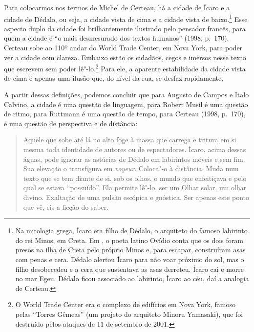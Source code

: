 Para colocarmos nos termos de Michel de Certeau, há a cidade de Ícaro e
a cidade de Dédalo, ou seja, a cidade vista de cima e a cidade vista de
baixo.\footnote{Na mitologia grega, Ícaro era filho de Dédalo, o
  arquiteto do famoso labirinto do rei Minos, em Creta. Em
  {}, o poeta latino Ovídio conta que os dois foram
  presos na ilha de Creta pelo próprio Minos e, para escapar,
  construíram asas com penas e cera. Dédalo alertou Ícaro para não voar
  próximo do sol, mas o filho desobecedeu e a cera que sustentava as
  asas derreteu. Ícaro cai e morre no mar Egeu. Dédalo ficou associado
  ao labirinto, Ícaro ao céu, daí a analogia de Certeau.} Esse aspecto
duplo da cidade foi brilhantemente ilustrado pelo pensador francês, para
quem a cidade é ``o mais desmesurado dos textos humanos'' (1998, p.~170). Certeau sobe ao 110º andar do World Trade Center, em Nova York,
para poder ver a cidade com clareza. Embaixo estão os cidadãos, cegos e
imersos nesse texto que escrevem sem poder lê"-lo.\footnote{O World Trade
  Center era o complexo de edifícios em Nova York, famoso pelas ``Torres
  Gêmeas'' (um projeto do arquiteto Minoru Yamasaki), que foi destruído
  pelos ataques de 11 de setembro de 2001.} Para ele, a aparente
estabilidade da cidade vista de cima é apenas uma ilusão que, do nível
da rua, se desfaz rapidamente.

A partir dessas definições, podemos concluir que para Augusto de Campos
e Italo Calvino, a cidade é uma questão de linguagem, para Robert Musil
é uma questão de ritmo, para Ruttmann é uma questão de tempo, para
Certeau (1998, p.~170), é uma questão de perspectiva e de distância:

\begin{quote}
Aquele que sobe até lá no alto foge à massa que carrega e tritura em si
mesma toda identidade de autores ou de espectadores. Ícaro, acima dessas
águas, pode ignorar as astúcias de Dédalo em labirintos móveis e
sem fim. Sua elevação o transfigura em \emph{voyeur}. Coloca"-o à
distância. Muda num texto que se tem diante de si, sob os olhos, o mundo
que enfeitiçava e pelo qual se estava ``possuído''. Ela permite lê"-lo,
ser um Olhar solar, um olhar divino. Exaltação de uma pulsão escópica e
gnóstica. Ser apenas este ponto que vê, eis a ficção do saber.
\end{quote}

